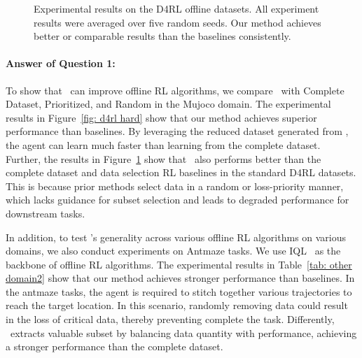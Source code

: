 \begin{figure}[t]
    \centering
    \caption{Experimental results on the D4RL offline datasets. All experiment results were averaged over five random seeds. Our method achieves better or comparable results than the baselines consistently.}
    \label{fig: d4rl original}
\end{figure}

\paragraph{Answer of Question 1:}
To show that \name~can improve offline RL algorithms, we compare \name~with Complete Dataset, Prioritized, and Random in the Mujoco domain.
The experimental results in Figure~\ref{fig: d4rl hard} show that our method achieves superior performance than baselines.
By leveraging the reduced dataset generated from \name, the agent can learn much faster than learning from the complete dataset.
Further, the results in Figure~\ref{fig: d4rl original} show that \name~also performs better than the complete dataset and data selection RL baselines in the standard D4RL datasets. 
This is because prior methods select data in a random or loss-priority manner, which lacks guidance for subset selection and leads to degraded performance for downstream tasks.

In addition, to test \name's generality across various offline RL algorithms on various domains, we also conduct experiments on Antmaze tasks.
We use IQL~\citep{kostrikov2021offline} as the backbone of offline RL algorithms.
The experimental results in Table~\ref{tab: other domain2} show that our method achieves stronger performance than baselines.
In the antmaze tasks, the agent is required to stitch together various trajectories to reach the target location.
In this scenario, randomly removing data could result in the loss of critical data, thereby preventing complete the task.
Differently, \name~extracts valuable subset by balancing data quantity with performance, achieving a stronger performance than the complete dataset.

